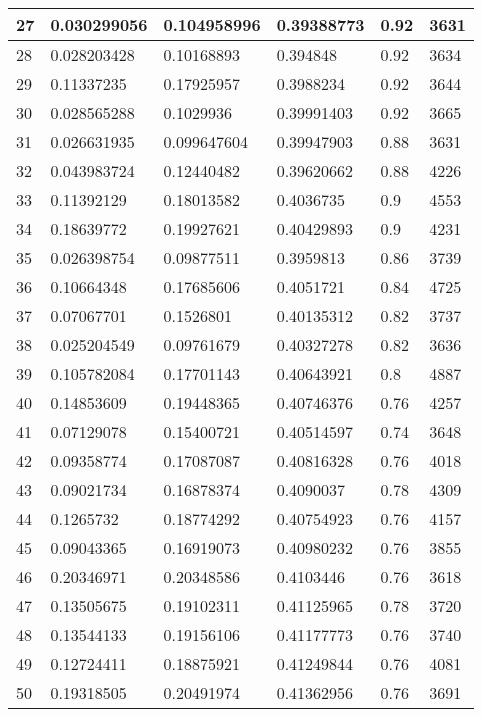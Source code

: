 \begin{longtable}{|l|l|l|l|l|l|}
27 & 0.030299056 & 0.104958996 & 0.39388773 & 0.92 & 3631 \\ \hline 
28 & 0.028203428 & 0.10168893 & 0.394848 & 0.92 & 3634 \\ \hline 
29 & 0.11337235 & 0.17925957 & 0.3988234 & 0.92 & 3644 \\ \hline 
30 & 0.028565288 & 0.1029936 & 0.39991403 & 0.92 & 3665 \\ \hline 
31 & 0.026631935 & 0.099647604 & 0.39947903 & 0.88 & 3631 \\ \hline 
32 & 0.043983724 & 0.12440482 & 0.39620662 & 0.88 & 4226 \\ \hline 
33 & 0.11392129 & 0.18013582 & 0.4036735 & 0.9 & 4553 \\ \hline 
34 & 0.18639772 & 0.19927621 & 0.40429893 & 0.9 & 4231 \\ \hline 
35 & 0.026398754 & 0.09877511 & 0.3959813 & 0.86 & 3739 \\ \hline 
36 & 0.10664348 & 0.17685606 & 0.4051721 & 0.84 & 4725 \\ \hline 
37 & 0.07067701 & 0.1526801 & 0.40135312 & 0.82 & 3737 \\ \hline 
38 & 0.025204549 & 0.09761679 & 0.40327278 & 0.82 & 3636 \\ \hline 
39 & 0.105782084 & 0.17701143 & 0.40643921 & 0.8 & 4887 \\ \hline 
40 & 0.14853609 & 0.19448365 & 0.40746376 & 0.76 & 4257 \\ \hline 
41 & 0.07129078 & 0.15400721 & 0.40514597 & 0.74 & 3648 \\ \hline 
42 & 0.09358774 & 0.17087087 & 0.40816328 & 0.76 & 4018 \\ \hline 
43 & 0.09021734 & 0.16878374 & 0.4090037 & 0.78 & 4309 \\ \hline 
44 & 0.1265732 & 0.18774292 & 0.40754923 & 0.76 & 4157 \\ \hline 
45 & 0.09043365 & 0.16919073 & 0.40980232 & 0.76 & 3855 \\ \hline 
46 & 0.20346971 & 0.20348586 & 0.4103446 & 0.76 & 3618 \\ \hline 
47 & 0.13505675 & 0.19102311 & 0.41125965 & 0.78 & 3720 \\ \hline 
48 & 0.13544133 & 0.19156106 & 0.41177773 & 0.76 & 3740 \\ \hline 
49 & 0.12724411 & 0.18875921 & 0.41249844 & 0.76 & 4081 \\ \hline 
50 & 0.19318505 & 0.20491974 & 0.41362956 & 0.76 & 3691 \\ \hline 
\end{longtable}